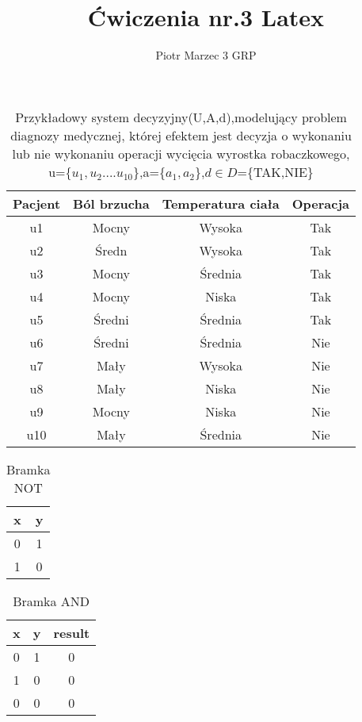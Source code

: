 \documentclass[a4paper]{article}
\author{Piotr Marzec 3 GRP}
\title{Ćwiczenia nr.3 Latex}
\begin{document}
\begin{center}
    \begin{table}[H]
        \centering\caption{Przykładowy system decyzyjny(U,A,d),modelujący problem diagnozy medycznej, której efektem jest decyzja o wykonaniu lub nie wykonaniu operacji wycięcia wyrostka robaczkowego, u=\{$u_1,u_2....u_{10}$\},a=\{$a_1,a_2$\},$d\in D$=\{TAK,NIE\} }
        \begin{tabular}{c|c|c|c}
             \hline
             \hline
           Pacjent & Ból brzucha & Temperatura ciała & Operacja\\
           \hline
           u1 & Mocny & Wysoka & Tak\\
           u2 & Średn & Wysoka & Tak\\
           u3 & Mocny & Średnia & Tak\\
           u4 & Mocny & Niska & Tak \\
           u5 & Średni & Średnia & Tak \\
           u6 & Średni & Średnia & Nie \\
           u7 & Mały & Wysoka & Nie \\
           u8 & Mały & Niska & Nie \\
           u9 & Mocny & Niska & Nie \\
           u10 & Mały & Średnia & Nie \\
           \hline
           \hline
        \end{tabular}
    \end{table}
    \begin{table}[H]
        \centering\caption{Bramka NOT}
        \begin{tabular}{|c|c|}
            \hline
             x&y  \\
             \hline
             0&1 \\
             \hline
             1&0 \\
             \hline
        \end{tabular}
    \end{table}
       \begin{table}[H]
        \centering\caption{Bramka AND}
        \begin{tabular}{|c|c|c|}
            \hline
             x&y&result  \\
             \hline
             0&1&0 \\
             \hline
             1&0&0 \\
             \hline
             0&0&0\\

\end{tabular}
\end{table}
\end{center}
\end{document}
